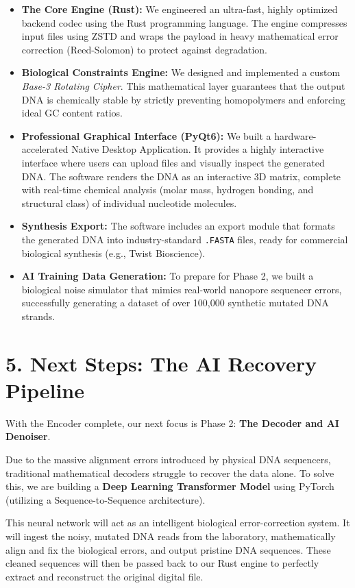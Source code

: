\documentclass[12pt, a4paper]{article}
\begin{document}
\begin{itemize}
    \item \textbf{The Core Engine (Rust):} We engineered an ultra-fast, highly optimized backend codec using the Rust programming language. The engine compresses input files using ZSTD and wraps the payload in heavy mathematical error correction (Reed-Solomon) to protect against degradation.
    
    \item \textbf{Biological Constraints Engine:} We designed and implemented a custom \textit{Base-3 Rotating Cipher}. This mathematical layer guarantees that the output DNA is chemically stable by strictly preventing homopolymers and enforcing ideal GC content ratios.
    
    \item \textbf{Professional Graphical Interface (PyQt6):} We built a hardware-accelerated Native Desktop Application. It provides a highly interactive interface where users can upload files and visually inspect the generated DNA. The software renders the DNA as an interactive 3D matrix, complete with real-time chemical analysis (molar mass, hydrogen bonding, and structural class) of individual nucleotide molecules.
    
    \item \textbf{Synthesis Export:} The software includes an export module that formats the generated DNA into industry-standard \texttt{.FASTA} files, ready for commercial biological synthesis (e.g., Twist Bioscience).
    
    \item \textbf{AI Training Data Generation:} To prepare for Phase 2, we built a biological noise simulator that mimics real-world nanopore sequencer errors, successfully generating a dataset of over 100,000 synthetic mutated DNA strands.
\end{itemize}

\section*{5. Next Steps: The AI Recovery Pipeline}
With the Encoder complete, our next focus is Phase 2: \textbf{The Decoder and AI Denoiser}.

Due to the massive alignment errors introduced by physical DNA sequencers, traditional mathematical decoders struggle to recover the data alone. To solve this, we are building a \textbf{Deep Learning Transformer Model} using PyTorch (utilizing a Sequence-to-Sequence architecture). 

This neural network will act as an intelligent biological error-correction system. It will ingest the noisy, mutated DNA reads from the laboratory, mathematically align and fix the biological errors, and output pristine DNA sequences. These cleaned sequences will then be passed back to our Rust engine to perfectly extract and reconstruct the original digital file.
\end{document}
